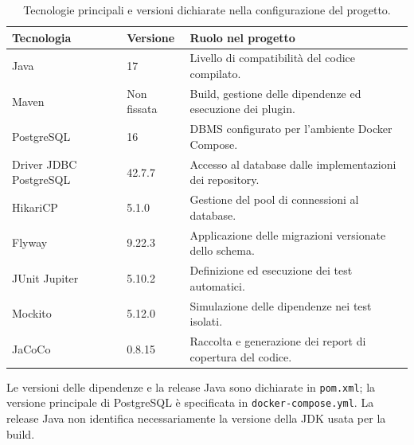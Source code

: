 \begin{table}[htbp]
\centering
\small
\caption{Tecnologie principali e versioni dichiarate nella configurazione del progetto.}
\label{tab:tecnologie}
\begin{tabularx}{\textwidth}{@{}p{}p{}X@{}}
\toprule
\textbf{Tecnologia} & \textbf{Versione} & \textbf{Ruolo nel progetto} \\
\midrule
Java & 17 & Livello di compatibilità del codice compilato. \\
Maven & Non fissata & Build, gestione delle dipendenze ed esecuzione dei plugin. \\
PostgreSQL & 16 & DBMS configurato per l'ambiente Docker Compose. \\
Driver JDBC PostgreSQL & 42.7.7 & Accesso al database dalle implementazioni dei repository. \\
HikariCP & 5.1.0 & Gestione del pool di connessioni al database. \\
Flyway & 9.22.3 & Applicazione delle migrazioni versionate dello schema. \\
JUnit Jupiter & 5.10.2 & Definizione ed esecuzione dei test automatici. \\
Mockito & 5.12.0 & Simulazione delle dipendenze nei test isolati. \\
JaCoCo & 0.8.15 & Raccolta e generazione dei report di copertura del codice. \\
\bottomrule
\end{tabularx}
\par\smallskip
\begin{minipage}{\textwidth}
\footnotesize
Le versioni delle dipendenze e la release Java sono dichiarate in \texttt{pom.xml};
la versione principale di PostgreSQL è specificata in \texttt{docker-compose.yml}.
La release Java non identifica necessariamente la versione della JDK usata per la build.
\end{minipage}
\end{table}
